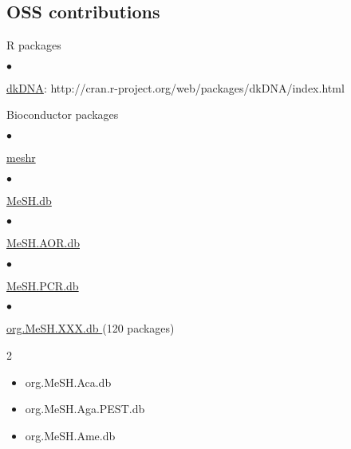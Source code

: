 \documentclass[margin,line,10pt]{res}
\newenvironment{list1}{
  \begin{list}{\ding{113}}{%
      \setlength{\itemsep}{0in}
      \setlength{\parsep}{0in} \setlength{\parskip}{0in}
      \setlength{\topsep}{0in} \setlength{\partopsep}{0in} 
      \setlength{\leftmargin}{0.17in}}}{\end{list}}
\newenvironment{list2}{
  \begin{list}{$\bullet$}{%
      \setlength{\itemsep}{0in}
      \setlength{\parsep}{0in} \setlength{\parskip}{0in}
      \setlength{\topsep}{0in} \setlength{\partopsep}{0in} 
      \setlength{\leftmargin}{0.2in}}}{\end{list}}
\begin{document}
\begin{resume}
\section{\sc OSS contributions} 
\begin{list1}
\item[] R packages
\begin{list2}
\item \textcolor{blue}{\href{http://cran.r-project.org/web/packages/dkDNA/index.html}{dkDNA}}: http://cran.r-project.org/web/packages/dkDNA/index.html
\end{list2}
\vspace{0.3cm}
\item[] Bioconductor packages
\begin{list2}
\item \textcolor{blue}{\href{http://bioconductor.org/packages/release/bioc/html/meshr.html}{meshr}}
\end{list2}
\vspace{0.3cm}
\begin{list2}
\item  \textcolor{blue}{\href{http://bioconductor.org/packages/release/data/annotation/html/MeSH.db.html}{MeSH.db}}
\end{list2}
\vspace{0.3cm}
\begin{list2}
\item \textcolor{blue}{\href{http://www.bioconductor.org/packages/release/data/annotation/html/MeSH.AOR.db.html}{MeSH.AOR.db}}
\end{list2}
\vspace{0.3cm}
\begin{list2}
\item \textcolor{blue}{\href{http://www.bioconductor.org/packages/release/data/annotation/html/MeSH.PCR.db.html}{MeSH.PCR.db}}
\end{list2}
\vspace{0.3cm}
\begin{list2}
\item \textcolor{blue}{\href{http://www.bioconductor.org/packages/release/data/annotation/}{org.MeSH.XXX.db }} (120 packages)
\end{list2}
\begin{multicols}{2}
\begin{itemize}
\item org.MeSH.Aca.db
\item org.MeSH.Aga.PEST.db
\item org.MeSH.Ame.db

\end{itemize}
\end{multicols}
\end{list1}
\end{resume}
\end{document}
